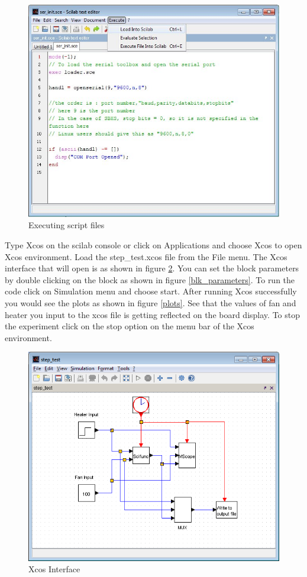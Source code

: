 \documentclass[12pt]{report}
\begin{document}
\begin{figure}
\centering
\includegraphics[width=0.7\linewidth]{scilab1.jpg}
\caption{Executing script files}
\label{exec}
\end{figure}


Type {\ttfamily Xcos} on the scilab console or click on Applications and choose {\ttfamily Xcos} to open Xcos environment. Load the {\ttfamily step\_test.xcos} file from the File menu. The Xcos interface that will open is as shown in figure \ref{Xcosintr}. You can set the block parameters by double clicking on the block as shown in figure \ref{blk_parameters}. To run the code click on Simulation menu and choose start. After running Xcos successfully you would see the plots as shown in figure \ref{plots}. See that the values of fan and heater you input to the xcos file is getting reflected on the board display. To stop the experiment click on the {\ttfamily stop} option on the menu bar of the Xcos environment.
\begin{figure}
\centering
\includegraphics[width=0.7\linewidth]{xcos.png}
\caption{Xcos Interface}
\label{Xcosintr}
\end{figure}
\end{document}
